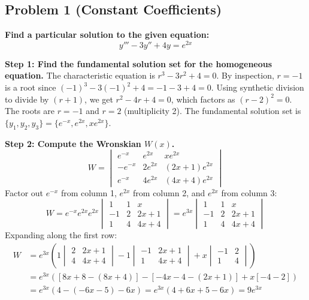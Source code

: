\documentclass[12pt]{article}
\begin{document}
\subsection{Problem 1 (Constant Coefficients)}
\textbf{Find a particular solution to the given equation:}
\[ y''' - 3y'' + 4y = e^{2x} \]

\textbf{Step 1: Find the fundamental solution set for the homogeneous equation.}
The characteristic equation is $r^3 - 3r^2 + 4 = 0$. 
By inspection, $r = -1$ is a root since $(-1)^3 - 3(-1)^2 + 4 = -1 - 3 + 4 = 0$.
Using synthetic division to divide by $(r+1)$, we get $r^2 - 4r + 4 = 0$, which factors as $(r-2)^2 = 0$.
The roots are $r = -1$ and $r = 2$ (multiplicity 2).
The fundamental solution set is $\{y_1, y_2, y_3\} = \{e^{-x}, e^{2x}, x e^{2x}\}$.

\textbf{Step 2: Compute the Wronskian $W(x)$.}
\[ W = \begin{vmatrix} e^{-x} & e^{2x} & x e^{2x} \\ -e^{-x} & 2e^{2x} & (2x+1)e^{2x} \\ e^{-x} & 4e^{2x} & (4x+4)e^{2x} \end{vmatrix} \]
Factor out $e^{-x}$ from column 1, $e^{2x}$ from column 2, and $e^{2x}$ from column 3:
\[ W = e^{-x} e^{2x} e^{2x} \begin{vmatrix} 1 & 1 & x \\ -1 & 2 & 2x+1 \\ 1 & 4 & 4x+4 \end{vmatrix} = e^{3x} \begin{vmatrix} 1 & 1 & x \\ -1 & 2 & 2x+1 \\ 1 & 4 & 4x+4 \end{vmatrix} \]
Expanding along the first row:
\begin{align*}
W &= e^{3x} \left( 1 \begin{vmatrix} 2 & 2x+1 \\ 4 & 4x+4 \end{vmatrix} - 1 \begin{vmatrix} -1 & 2x+1 \\ 1 & 4x+4 \end{vmatrix} + x \begin{vmatrix} -1 & 2 \\ 1 & 4 \end{vmatrix} \right) \\
&= e^{3x} \left( [8x+8 - (8x+4)] - [-4x-4 - (2x+1)] + x[-4 - 2] \right) \\
&= e^{3x} \left( 4 - (-6x-5) - 6x \right) = e^{3x} (4 + 6x + 5 - 6x) = 9e^{3x}
\end{align*}
\end{document}
